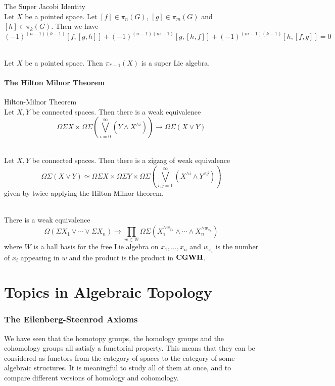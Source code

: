 \documentclass[a4paper]{article}
\begin{document}
\begin{prp}{The Super Jacobi Identity}{}\\
Let $X$ be a pointed space. Let $[f]\in\pi_n(G)$, $[g]\in\pi_m(G)$ and $[h]\in\pi_k(G)$. Then we have $$(-1)^{(n-1)(k-1)}[f,[g,h]]+(-1)^{(n-1)(m-1)}[g,[h,f]]+(-1)^{(m-1)(k-1)}[h,[f,g]]=0$$
\end{prp}

\begin{crl}{}{}\\
Let $X$ be a pointed space. Then $\pi_{\ast-1}(X)$ is a super Lie algebra. 
\end{crl}

\subsection{The Hilton Milnor Theorem}
\begin{thm}{Hilton-Milnor Theorem}{}\\
Let $X,Y$ be connected spaces. Then there is a weak equivalence $$\Omega\Sigma X\times\Omega\Sigma\left(\bigvee_{i=0}^\infty(Y\wedge X^{\wedge i})\right)\to\Omega\Sigma(X\vee Y)$$
\end{thm}

\begin{crl}{}{}\\
Let $X,Y$ be connected spaces. Then there is a zigzag of weak equivalence $$\Omega\Sigma(X\vee Y)\simeq\Omega\Sigma X\times\Omega\Sigma Y\times\Omega\Sigma\left(\bigvee_{i,j=1}^\infty(X^{\wedge i}\wedge Y^{\wedge j})\right)$$ given by twice applying the Hilton-Milnor theorem. 
\end{crl}

\begin{crl}{}{}\\
There is a weak equivalence $$\Omega\left(\Sigma X_1\vee\cdots\vee\Sigma X_n\right)\to\prod_{w\in W}\Omega\Sigma\left(X_1^{\wedge w_{x_1}}\wedge\cdots\wedge X_n^{\wedge w_{x_n}}\right)$$ where $W$ is a hall basis for the free Lie algebra on $x_1,\dots,x_n$ and $w_{x_i}$ is the number of $x_i$ appearing in $w$ and the product is the product in $\bold{CGWH}$. 
\end{crl}


\pagebreak
\part{Topics in Algebraic Topology}

\pagebreak
\section{The Eilenberg-Steenrod Axioms}
We have seen that the homotopy groups, the homology groups and the cohomology groups all satisfy a functorial property. This means that they can be considered as functors from the category of spaces to the category of some algebraic structures. It is meaningful to study all of them at once, and to compare different versions of homology and cohomology. \\
\end{document}
